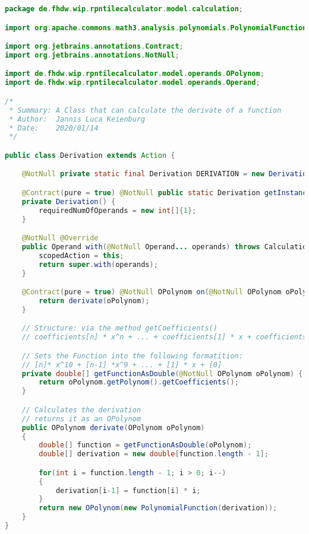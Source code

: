 \begin{lstlisting}[caption=Derivation (Keienburg),label=list:Derivation,language=Java]
package de.fhdw.wip.rpntilecalculator.model.calculation;

import org.apache.commons.math3.analysis.polynomials.PolynomialFunction;

import org.jetbrains.annotations.Contract;
import org.jetbrains.annotations.NotNull;

import de.fhdw.wip.rpntilecalculator.model.operands.OPolynom;
import de.fhdw.wip.rpntilecalculator.model.operands.Operand;

/*
 * Summary: A Class that can calculate the derivate of a function
 * Author:  Jannis Luca Keienburg
 * Date:    2020/01/14
 */

public class Derivation extends Action {

    @NotNull private static final Derivation DERIVATION = new Derivation();

    @Contract(pure = true) @NotNull public static Derivation getInstance() { return DERIVATION; }
    private Derivation() {
        requiredNumOfOperands = new int[]{1};
    }

    @NotNull @Override
    public Operand with(@NotNull Operand... operands) throws CalculationException {
        scopedAction = this;
        return super.with(operands);
    }

    @Contract(pure = true) @NotNull OPolynom on(@NotNull OPolynom oPolynom) {
        return derivate(oPolynom);
    }

    // Structure: via the method getCoefficients()
    // coefficients[n] * x^n + ... + coefficients[1] * x + coefficients[0]

    // Sets the Function into the following formatition:
    // [n]* x^10 + [n-1] *x^9 + ... + [1] * x + [0]
    private double[] getFunctionAsDouble(@NotNull OPolynom oPolynom) {
        return oPolynom.getPolynom().getCoefficients();
    }

    // Calculates the derivation
    // returns it as an OPolynom
    public OPolynom derivate(OPolynom oPolynom)
    {
        double[] function = getFunctionAsDouble(oPolynom);
        double[] derivation = new double[function.length - 1];

        for(int i = function.length - 1; i > 0; i--)
        {
            derivation[i-1] = function[i] * i;
        }
        return new OPolynom(new PolynomialFunction(derivation));
    }
}
\end{lstlisting}    

